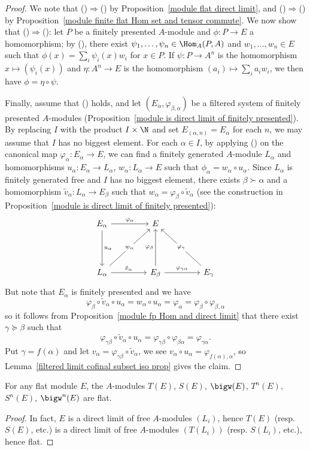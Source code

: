 \begin{proof}
We note that ()$\Rightarrow$() by Proposition~\ref{module flat direct limit}, and ()$\Rightarrow$() by Proposition~\ref{module finite flat Hom set and tensor commute}. We now show that ()$\Rightarrow$(): let $P$ be a finitely presented $A$-module and $\phi:P\to E$ a homomorphism; by (), there exist $\psi_1,\dots,\psi_n\in\Hom_A(P,A)$ and $w_1,\dots,w_n\in E$ such that $\phi(x)=\sum_i\psi_i(x)w_i$ for $x\in P$. If $\psi:P\to A^n$ is the homomorphism $x\mapsto(\psi_i(x))$ and $\eta:A^n\to E$ is the homomorphism $(a_i)\mapsto\sum_ia_iw_i$, we then have $\phi=\eta\circ\psi$.\par
Finally, assume that () holds, and let $(E_\alpha,\varphi_{\beta,\alpha})$ be a filtered system of finitely presented $A$-modules (Proposition~\ref{module is direct limit of finitely presented}). By replacing $I$ with the product $I\times\N$ and set $E_{(\alpha,n)}=E_\alpha$ for each $n$, we may assume that $I$ has no biggest element. For each $\alpha\in I$, by applying () on the canonical map $\varphi_\alpha:E_\alpha\to E$, we can find a finitely generated $A$-module $L_\alpha$ and homomorphisms $u_\alpha:E_\alpha\to L_\alpha$, $w_\alpha:L_\alpha\to E$ such that $\phi_\alpha=w_\alpha\circ u_\alpha$. Since $L_\alpha$ is finitely generated free and $I$ has no biggest element, there exists $\beta\succ\alpha$ and a homomorphism $\tilde{v}_\alpha:L_\alpha\to E_\beta$ such that $w_\alpha=\varphi_\beta\circ \tilde{v}_\alpha$ (see the construction in Proposition~\ref{module is direct limit of finitely presented}):
\[\begin{tikzcd}[row sep=15mm,column sep=15mm]
E_\alpha\ar[r,"\varphi_\alpha"]\ar[d,"u_\alpha"]&E&{}\\
L_\alpha\ar[ru,"w_\alpha"description]\ar[r,"\tilde{v}_\alpha"]&E_\beta\ar[r,"\varphi_{\gamma\alpha}"]\ar[u,"\varphi_\beta"]&E_\gamma\ar[lu,swap,"\varphi_\gamma"description]
\end{tikzcd}\]
But note that $E_\alpha$ is finitely presented and we have
\[\varphi_\beta\circ\tilde{v}_\alpha\circ u_\alpha=w_\alpha\circ u_\alpha=\varphi_\alpha=\varphi_\beta\circ\varphi_{\beta,\alpha}\]
so it follows from Proposition~\ref{module fp Hom and direct limit} that there exist $\gamma\succeq\beta$ such that
\[\varphi_{\gamma\beta}\circ\tilde{v}_\alpha\circ u_\alpha=\varphi_{\gamma\beta}\circ\varphi_{\beta\alpha}=\varphi_{\gamma\alpha}.\]
Put $\gamma=f(\alpha)$ and let $v_\alpha=\varphi_{\gamma\beta}\circ\tilde{v}_\alpha$, we see $v_\alpha\circ u_\alpha=\varphi_{f(\alpha),\alpha}$, so Lemma~\ref{filtered limit cofinal subset iso prop} gives the claim.
\end{proof}
\begin{corollary}
For any flat module $E$, the $A$-modules $T(E)$, $S(E)$, $\bigw(E)$, $T^n(E)$, $S^n(E)$, $\bigw^n(E)$ are flat.
\end{corollary}
\begin{proof}
In fact, $E$ is a direct limit of free $A$-modules $(L_i)$, hence $T(E)$ (resp. $S(E)$, etc.) is a direct limit of free $A$-modules $(T(L_i))$ (resp. $S(L_i)$, etc.), hence flat.
\end{proof}
